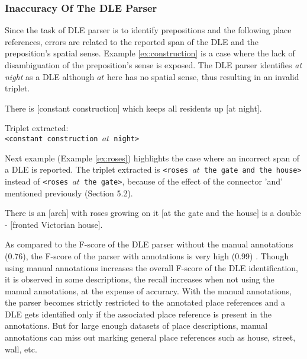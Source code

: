 \documentclass{acm_proc_article-sp}
\begin{document}
\subsubsection{Inaccuracy Of The DLE Parser}
Since the task of DLE parser is to identify prepositions and the following place references, errors are related to the reported span of the DLE and the preposition's spatial sense. Example \ref{ex:construction} is a case where the lack of disambiguation of the preposition's sense is exposed. The DLE parser identifies \textit{at night} as a DLE although $at$ here has no spatial sense, thus resulting in an invalid triplet.
\label{subsub:DLE}
\begin{example}
\label{ex:construction}
There is $[$constant construction$]$ which keeps all residents up $[$at night$]$.
\end{example}
Triplet extracted:\\
\texttt{<constant construction $at$ night>}

Next example (Example \ref{ex:roses}) highlights the case where an incorrect span of a DLE is reported. The triplet extracted is \texttt{<roses $at$ the gate and the house>} instead of \texttt{<roses $at$ the gate>}, because of the effect of the connector 'and' mentioned previously (Section 5.2).
\begin{example}
\label{ex:roses}
There is an $[$arch$]$ with roses growing on it $[$at the gate and the house$]$ is a double - $[$fronted Victorian house$]$.
\end{example}
As compared to the F-score of the DLE parser without the manual annotations (0.76), the F-score of the parser with annotations is very high (0.99) \cite{fei:locative}. 
Though using manual annotations increases the overall F-score of the DLE identification, it is observed in some descriptions, the recall increases when not using the manual annotations, at the expense of accuracy. With the manual annotations, the parser becomes strictly restricted to the annotated place references and a DLE gets identified only if the associated place reference is present in the annotations. But for large enough datasets of place descriptions, manual annotations can miss out marking general place references such as house, street, wall, etc. 
\end{document}
